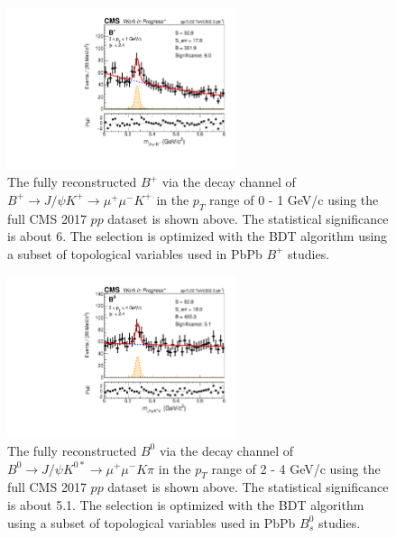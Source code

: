 \begin{figure}[hbtp]
\begin{center}
\includegraphics[width=0.60\textwidth]{Figures/Chapter6/BPLow.pdf}
\caption{The fully reconstructed $B^+$ via the decay channel of $B^+\rightarrow J/\psi K^+ \rightarrow \mu^+\mu^- K^+$ in the $p_T$ range of 0 - 1 GeV/c using the full CMS 2017 $pp$ dataset is shown above. The statistical significance is about 6. The selection is optimized with the BDT algorithm using a subset of topological variables used in PbPb $B^+$ studies.}
\label{BPLow}
\end{center}
\end{figure}   
 
 \begin{figure}[hbtp]
\begin{center}
\includegraphics[width=0.60\textwidth]{Figures/Chapter6/BZLow.pdf}
\caption{The fully reconstructed $B^0$ via the decay channel of $B^0\rightarrow J/\psi K^{0*} \rightarrow \mu^+\mu^- K \pi$ in the $p_T$ range of 2 - 4 GeV/c using the full CMS 2017 $pp$ dataset is shown above. The statistical significance is about 5.1. The selection is optimized with the BDT algorithm using a subset of topological variables used in PbPb $B^0_s$ studies.}
\label{BZLow}
\end{center}
\end{figure}   

